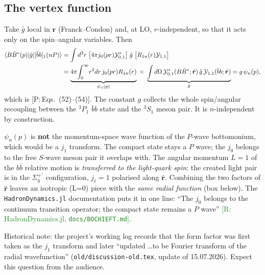 \documentclass[11pt,a4paper]{article}
\newcommand{\tagP}[1]{\textcolor{blue!65!black}{\textsf{\small[P:\,#1]}}}
\newcommand{\tagR}[1]{\textcolor{ForestGreen}{\textsf{\small[R:\,#1]}}}
\newcommand{\tagD}{\textcolor{orange!85!black}{\textsf{\small[D]}}}
\newcommand{\BBst}{B\bar B^*}
\renewcommand{\bbnP}{[\bar bb]_1(nP)}
\newcommand{\calY}{{\cal Y}}
\begin{document}
\subsection{The vertex function}

\begin{derbox}[Derivation of the vertex \tagD]
Take $\hat g$ local in $\bm r$ (Franck--Condon) and, at LO, $r$-independent, so that it acts only on the spin--angular variables. Then
\begin{align}
\braket{\BBst(p)|\hat g|\bbnP}
&=\int d^3r\;\big[4\pi j_0(pr)\calY_{0,1}^*\big]\;\hat g\;\big[R_{1n}(r)\calY_{1,1}\big]\nonumber\\
&=\underbrace{4\pi\!\int_0^\infty\! r^2dr\,j_0(pr)R_{1n}(r)}_{\psi_n(p)}\;\times\;\underbrace{\int d\Omega\,\calY^{*}_{0,1}(\BBst;\hat{\bm r})\,\hat g\,\calY_{1,1}(\bar bb;\hat{\bm r})}_{g}
=g\,\psi_n(p),
\label{eq:FC}
\end{align}
which is \tagP{Eqs.~(52)--(54)}. The constant $g$ collects the whole spin/angular recoupling between the $^3P_1$ $\bar bb$ state and the $^3S_1$ meson pair. It is $n$-independent by construction.
\end{derbox}

\begin{keybox}
$\psi_n(p)$ is \textbf{not} the momentum-space wave function of the $P$-wave bottomonium, which would be a $j_1$ transform. The compact state stays a $P$ wave; the $j_0$ belongs to the free $S$-wave meson pair it overlaps with. The angular momentum $L=1$ of the $b\bar b$ relative motion is \emph{transferred to the light-quark spin}: the created light pair is in the $\Sigma_g^{+\prime}$ configuration, $j_\ell=1$ polarised along $\hat{\bm r}$. Combining the two factors of $\hat{\bm r}$ leaves an isotropic (L=0) piece with the \emph{same radial function} (box below). The \texttt{HadronDynamics.jl} documentation puts it in one line: ``The $j_0$ belongs to the continuum transition operator; the compact state remains a $P$ wave'' \tagR{HadronDynamics.jl, \texttt{docs/BOCHIEFT.md}}.

Historical note: the project's working log records that the form factor was first taken as the $j_1$ transform and later ``updated \dots to be Fourier transform of the radial wavefunction'' (\texttt{old/discussion-old.tex}, update of 15.07.2026). Expect this question from the audience.
\end{keybox}
\end{document}
